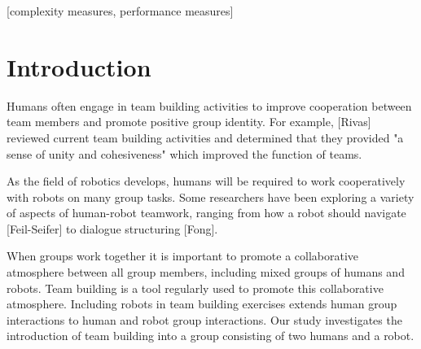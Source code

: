 \documentclass{acm_proc_article-sp}
\begin{document}
\maketitle
\begin{abstract}
This paper provides a sample of a \LaTeX\ document which conforms to
the formatting guidelines for ACM SIG Proceedings.
It complements the document \textit{Author's Guide to Preparing
ACM SIG Proceedings Using \LaTeX$2_\epsilon$\ and Bib\TeX}. This
source file has been written with the intention of being
compiled under \LaTeX$2_\epsilon$\ and BibTeX.

The developers have tried to include every imaginable sort
of ``bells and whistles", such as a subtitle, footnotes on
title, subtitle and authors, as well as in the text, and
every optional component (e.g. Acknowledgments, Additional
Authors, Appendices), not to mention examples of
equations, theorems, tables and figures.

To make best use of this sample document, run it through \LaTeX\
and BibTeX, and compare this source code with the printed
output produced by the dvi file.
\end{abstract}

[complexity measures, performance measures]



\section{Introduction}
Humans often engage in team building activities to improve cooperation between team members and promote positive group identity. For example, [Rivas] reviewed current team building activities and determined that they provided "a sense of unity and cohesiveness" which improved the function of teams.

As the field of robotics develops, humans will be required to work cooperatively with robots on many group tasks. Some researchers have been exploring a variety of aspects of human-robot teamwork, ranging from how a robot should navigate [Feil-Seifer] to dialogue structuring [Fong]. 

When groups work together it is important to promote a collaborative atmosphere between all group members, including mixed groups of humans and robots. Team building is a tool regularly used to promote this collaborative atmosphere. Including robots in team building exercises extends human group interactions to human and robot group interactions. Our study investigates the introduction of team building into a group consisting of two humans and a robot.
\end{document}
